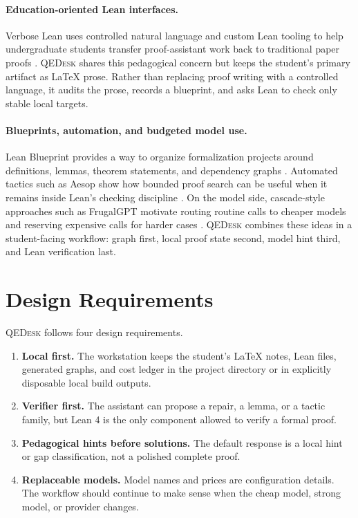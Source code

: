 \documentclass[11pt]{article}
\newcommand{\qedesk}{\textsc{QEDesk}}
\newcommand{\lean}{Lean 4}
\begin{document}
\paragraph{Education-oriented Lean interfaces.}
Verbose Lean uses controlled natural language and custom Lean tooling to help
undergraduate students transfer proof-assistant work back to traditional paper
proofs \cite{verboselean}.  \qedesk{} shares this pedagogical concern but keeps
the student's primary artifact as LaTeX prose.  Rather than replacing proof
writing with a controlled language, it audits the prose, records a blueprint,
and asks Lean to check only stable local targets.

\paragraph{Blueprints, automation, and budgeted model use.}
Lean Blueprint provides a way to organize formalization projects around
definitions, lemmas, theorem statements, and dependency graphs
\cite{leanblueprint}.  Automated tactics such as Aesop show how bounded proof
search can be useful when it remains inside Lean's checking discipline
\cite{aesop}.  On the model side, cascade-style approaches such as FrugalGPT
motivate routing routine calls to cheaper models and reserving expensive calls
for harder cases \cite{frugalgpt}.  \qedesk{} combines these ideas in a
student-facing workflow: graph first, local proof state second, model hint
third, and Lean verification last.

\section{Design Requirements}

\qedesk{} follows four design requirements.

\begin{enumerate}[leftmargin=2em]
  \item \textbf{Local first.}  The workstation keeps the student's LaTeX notes,
  Lean files, generated graphs, and cost ledger in the project directory or in
  explicitly disposable local build outputs.

  \item \textbf{Verifier first.}  The assistant can propose a repair, a lemma,
  or a tactic family, but \lean{} is the only component allowed to verify a
  formal proof.

  \item \textbf{Pedagogical hints before solutions.}  The default response is a
  local hint or gap classification, not a polished complete proof.

  \item \textbf{Replaceable models.}  Model names and prices are configuration
  details.  The workflow should continue to make sense when the cheap model,
  strong model, or provider changes.
\end{enumerate}
\end{document}
